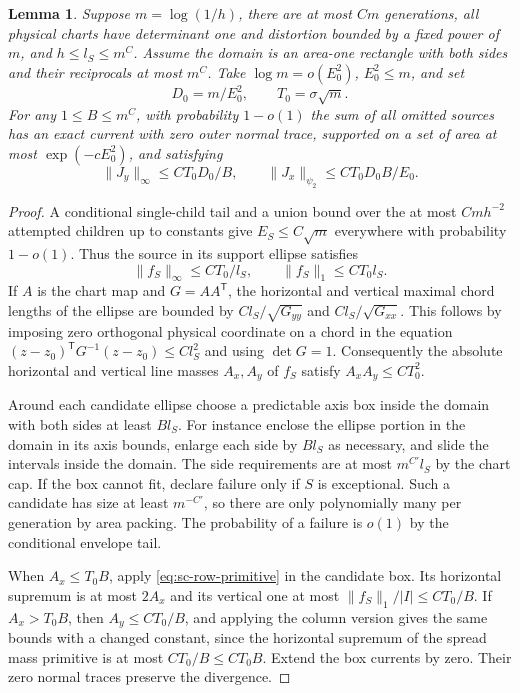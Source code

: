 \documentclass[11pt]{article}
\newtheorem{lemma}{Lemma}
\newcommand{\1}{\mathbf{1}}
\numberwithin{equation}{section}
\begin{document}
\begin{lemma}\label{lem:sc-sparse}
Suppose \(m=\log(1/h)\), there are at most \(Cm\) generations,
all physical charts have determinant one and distortion bounded
by a fixed power of \(m\), and \(h\le l_S\le m^C\).
Assume the domain is an area-one rectangle with both sides and
their reciprocals at most \(m^C\). Take
\(\log m=o(E_0^2)\), \(E_0^2\le m\), and set
\[
 D_0=m/E_0^2,\qquad T_0=\sigma\sqrt m .
\]
For any \(1\le B\le m^C\), with probability \(1-o(1)\)
the sum of all omitted sources has an exact current with
zero outer normal trace, supported on a set of area at
most \(\exp(-cE_0^2)\), and satisfying
\[
 \|J_y\|_\infty\le C T_0 D_0/B,\qquad
 \|J_x\|_{\psi_2}\le C T_0 D_0 B/E_0 .
\]
\end{lemma}
\begin{proof}
A conditional single-child tail and a union bound over
the at most \(Cm h^{-2}\) attempted children up to constants
give \(E_S\le C\sqrt m\) everywhere with probability
\(1-o(1)\). Thus the source in its support ellipse
satisfies
\[
 \|f_S\|_\infty\le C T_0/l_S,\qquad
 \|f_S\|_1\le C T_0 l_S .
\]
If \(A\) is the chart map and \(G=AA^{\mathsf T}\), the
horizontal and vertical maximal chord lengths of the ellipse
are bounded by \(Cl_S/\sqrt{G_{yy}}\) and
\(Cl_S/\sqrt{G_{xx}}\). This follows by imposing zero
orthogonal physical coordinate on a chord in the equation
\((z-z_0)^{\mathsf T}G^{-1}(z-z_0)\le C l_S^2\) and using
\(\det G=1\). Consequently the absolute horizontal and
vertical line masses \(A_x,A_y\) of \(f_S\) satisfy
\(A_xA_y\le C T_0^2\).

Around each candidate ellipse choose a predictable axis box
inside the domain with both sides at least \(B l_S\).
For instance enclose the ellipse portion in the domain
in its axis bounds, enlarge each side by \(B l_S\)
as necessary, and slide the intervals inside the domain.
The side requirements are at most \(m^{C'}l_S\) by
the chart cap. If the box cannot fit, declare failure
only if \(S\) is exceptional. Such a candidate has size
at least \(m^{-C'}\), so there are only polynomially
many per generation by area packing. The probability
of a failure is \(o(1)\) by the conditional envelope tail.

When \(A_x\le T_0 B\), apply \eqref{eq:sc-row-primitive}
in the candidate box. Its horizontal supremum is at
most \(2A_x\) and its vertical one at most
\(\|f_S\|_1/|I|\le CT_0/B\). If \(A_x>T_0 B\),
then \(A_y\le CT_0/B\), and applying the column version
gives the same bounds with a changed constant, since
the horizontal supremum of the spread mass primitive
is at most \(CT_0/B\le CT_0 B\). Extend the box
currents by zero. Their zero normal traces preserve
the divergence.


\end{proof}
\end{document}

